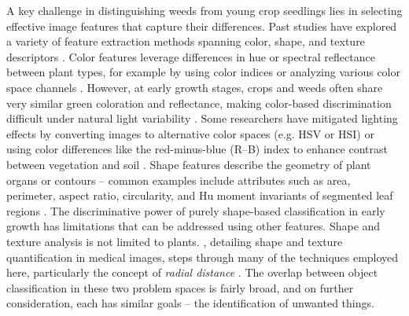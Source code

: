 \documentclass[letterpaper, notitlepage]{report}
\begin{document}
A key challenge in distinguishing weeds from young crop seedlings lies in selecting effective image features that capture their differences. Past studies have explored a variety of feature extraction methods spanning color, shape, and texture descriptors \parencite{Garibaldi-Marquez2022-yn}. Color features leverage differences in hue or spectral reflectance between plant types, for example by using color indices or analyzing various color space channels \parencite{Wu2021-gt}. However, at early growth stages, crops and weeds often share very similar green coloration and reflectance, making color-based discrimination difficult under natural light variability \parencite{Garibaldi-Marquez2022-yn}. Some researchers have mitigated lighting effects by converting images to alternative color spaces (e.g. HSV or HSI) or using color differences like the red-minus-blue (R–B) index to enhance contrast between vegetation and soil \parencite{Wu2021-gt}. Shape features describe the geometry of plant organs or contours – common examples include attributes such as area, perimeter, aspect ratio, circularity, and Hu moment invariants of segmented leaf regions \parencite{Garibaldi-Marquez2022-yn}. The discriminative power of purely shape-based classification in early growth has limitations that can be addressed using other features. Shape and texture analysis is not limited to plants. \citeauthor{Bankman2009-wq}, detailing shape and texture quantification in medical images, steps through many of the techniques employed here, particularly the concept of \textit{radial distance} \parencite{Bankman2009-wq}. The overlap between object classification in these two problem spaces is fairly broad, and on further consideration, each has similar goals -- the identification of unwanted things.
\end{document}
